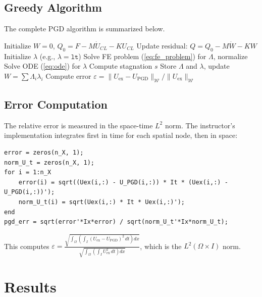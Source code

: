 \documentclass[11pt,a4paper]{article}
\begin{document}
\subsection{Greedy Algorithm}

The complete PGD algorithm is summarized below.

\begin{algorithm}[H]
\caption{Greedy PGD (without update)}
\begin{algorithmic}[1]
\State Initialize $W = 0$, $Q_0 = F - M\dot{U}_{CL} - KU_{CL}$
    \State Update residual: $Q = Q_0 - M\dot{W} - KW$
    \State Initialize $\lambda$ (e.g., $\lambda = \mathtt{lt}$)
        \State Solve FE problem (\ref{eq:fe_problem}) for $\Lambda$, normalize
        \State Solve ODE (\ref{eq:ode}) for $\lambda$
        \State Compute stagnation $s$
    \EndWhile
    \State Store $\Lambda$ and $\lambda$, update $W = \sum \Lambda_i \lambda_i$
    \State Compute error $\varepsilon = \|U_{\text{ex}} - U_{\text{PGD}}\|_\mathcal{W} / \|U_{\text{ex}}\|_\mathcal{W}$
\EndFor
\end{algorithmic}
\end{algorithm}

\subsection{Error Computation}

The relative error is measured in the space-time $L^2$ norm. The instructor's implementation integrates first in time for each spatial node, then in space:
\begin{lstlisting}
error = zeros(n_X, 1);
norm_U_t = zeros(n_X, 1);
for i = 1:n_X
    error(i) = sqrt((Uex(i,:) - U_PGD(i,:)) * It * (Uex(i,:) - U_PGD(i,:))');
    norm_U_t(i) = sqrt(Uex(i,:) * It * Uex(i,:)');
end
pgd_err = sqrt(error'*Ix*error) / sqrt(norm_U_t'*Ix*norm_U_t);
\end{lstlisting}

This computes $\varepsilon = \frac{\sqrt{\int_\Omega \left(\int_I (U_{\text{ex}} - U_{\text{PGD}})^2\,dt\right)dx}}{\sqrt{\int_\Omega \left(\int_I U_{\text{ex}}^2\,dt\right)dx}}$, which is the $L^2(\Omega \times I)$ norm.

\section{Results}
\end{document}
